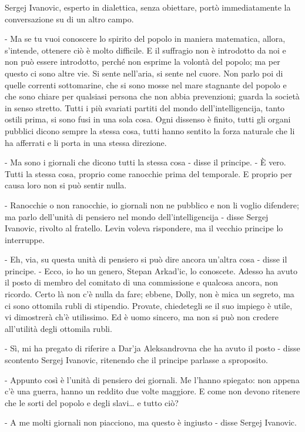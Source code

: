 Sergej Ivanovic, esperto in dialettica, senza obiettare, portò immediatamente la conversazione su di un altro campo. 

- Ma se tu vuoi conoscere lo spirito del popolo in maniera matematica, allora, s'intende, ottenere ciò è molto difficile. E il suffragio non è introdotto da noi e non può essere introdotto, perché non esprime la volontà del popolo; ma per questo ci sono altre vie. Si sente nell'aria, si sente nel cuore. Non parlo poi di quelle correnti sottomarine, che si sono mosse nel mare stagnante del popolo e che sono chiare per qualsiasi persona che non abbia prevenzioni; guarda la società in senso stretto. Tutti i più svariati partiti del mondo dell'intelligencija, tanto ostili prima, si sono fusi in una sola cosa. Ogni dissenso è finito, tutti gli organi pubblici dicono sempre la stessa cosa, tutti hanno sentito la forza naturale che li ha afferrati e li porta in una stessa direzione. 

- Ma sono i giornali che dicono tutti la stessa cosa - disse il principe. - È vero. Tutti la stessa cosa, proprio come ranocchie prima del temporale. E proprio per causa loro non si può sentir nulla. 

- Ranocchie o non ranocchie, io giornali non ne pubblico e non li voglio difendere; ma parlo dell'unità di pensiero nel mondo dell'intelligencija - disse Sergej Ivanovic, rivolto al fratello. Levin voleva rispondere, ma il vecchio principe lo interruppe. 

- Eh, via, su questa unità di pensiero si può dire ancora un'altra cosa - disse il principe. - Ecco, io ho un genero, Stepan Arkad'ic, lo conoscete. Adesso ha avuto il posto di membro del comitato di una commissione e qualcosa ancora, non ricordo. Certo là non c'è nulla da fare; ebbene, Dolly, non è mica un segreto, ma ci sono ottomila rubli di stipendio. Provate, chiedetegli se il suo impiego è utile, vi dimostrerà ch'è utilissimo. Ed è uomo sincero, ma non si può non credere all'utilità degli ottomila rubli. 

- Sì, mi ha pregato di riferire a Dar'ja Aleksandrovna che ha avuto il posto - disse scontento Sergej Ivanovic, ritenendo che il principe parlasse a sproposito. 

- Appunto così è l'unità di pensiero dei giornali. Me l'hanno spiegato: non appena c'è una guerra, hanno un reddito due volte maggiore. E come non devono ritenere che le sorti del popolo e degli slavi\ldots{} e tutto ciò? 

- A me molti giornali non piacciono, ma questo è ingiusto - disse Sergej Ivanovic. 

